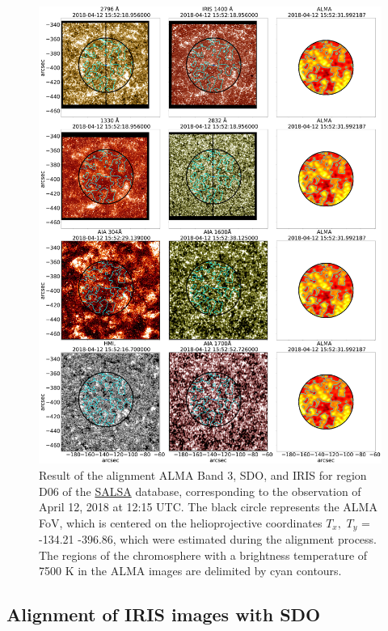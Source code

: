 \documentclass[a4paper,alpha-refs]{eSpectra}
\begin{document}
\begin{figure}[htb!]
   \centering
    \includegraphics[width=\textwidth]{images/result_alingnment_with_iris_new_plot_dpi_100.jpg}
    \caption{
    Result of the alignment  ALMA Band 3, SDO,  and IRIS for region D06 of the \href{http://sdc.uio.no/salsa/}{SALSA} database, corresponding to the observation of April 12, 2018 at 12:15 UTC. The black circle represents the ALMA FoV, which is centered on the helioprojective coordinates $T_x,$ $ T_y$ = -134.21 -396.86, which were estimated during the alignment process. The regions of the chromosphere with a brightness temperature of  7500 K in the ALMA images are delimited by cyan contours.}
    \label{chap_2:fig_result_IRIS_and_SDO_aling}
\end{figure}

\subsection{Alignment of IRIS images with SDO}
\label{Alignment_of_IRIS_images_with_SDO}
\end{document}
